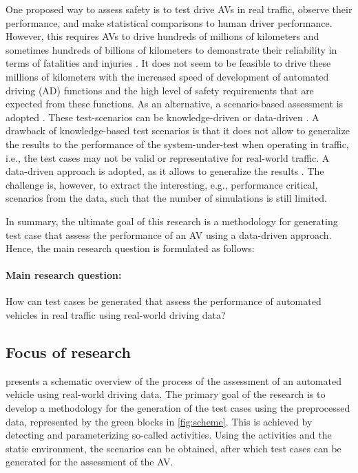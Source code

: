One proposed way to assess safety is to test drive AVs in real traffic, observe their performance, and make statistical comparisons to human driver performance. However, this requires AVs to drive hundreds of millions of kilometers and sometimes hundreds of billions of kilometers to demonstrate their reliability in terms of fatalities and injuries \cite{kalra2016driving}. It does not seem to be feasible to drive these millions of kilometers with the increased speed of development of automated driving (AD) functions and the high level of safety requirements that are expected from these functions. As an alternative, a scenario-based assessment is adopted \cite{putz2017pegasus, stellet2015taxonomy, deGelder2017assessment, ploeg2018cetran, elrofai2018scenario}. 
These test-scenarios can be knowledge-driven or data-driven \cite{stellet2015taxonomy}. A drawback of knowledge-based test scenarios is that it does not allow to generalize the results to the performance of the system-under-test when operating in traffic, i.e., the test cases may not be valid or representative for real-world traffic. A data-driven approach is adopted, as it allows to generalize the results \cite{deGelder2017assessment}. The challenge is, however, to extract the interesting, e.g., performance critical, scenarios from the data, such that the number of simulations is still limited.

In summary, the ultimate goal of this research is a methodology for generating test case that assess the performance of an AV using a data-driven approach. Hence, the main research question is formulated as follows:

\begin{mdframed}[style=MyFrame]
	\paragraph{Main research question:} How can test cases be generated that assess the performance of automated vehicles in real traffic using real-world driving data?
\end{mdframed}

\subsection{Focus of research}
\label{sec:focus}

 presents a schematic overview of the process of the assessment of an automated vehicle using real-world driving data. The primary goal of the research is to develop a methodology for the generation of the test cases using the preprocessed data, represented by the green blocks in \cref{fig:scheme}. This is achieved by detecting and parameterizing so-called activities. Using the activities and the static environment, the scenarios can be obtained, after which test cases can be generated for the assessment of the AV.

